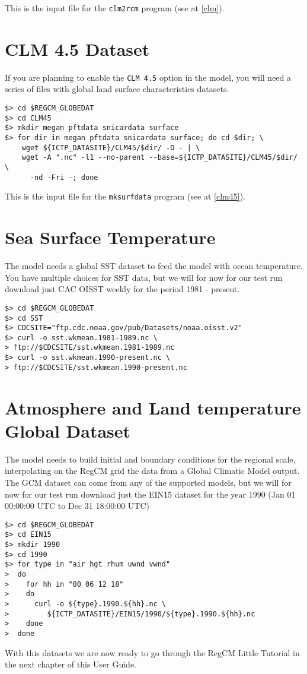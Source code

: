 This is the input file for the \verb=clm2rcm= program (see at \ref{clm}).

\section{CLM 4.5 Dataset}
\label{clm45data}

If you are planning to enable the \verb=CLM 4.5= option in the model, you will
need a series of files with global land surface characteristics datasets.

\begin{Verbatim}
$> cd $REGCM_GLOBEDAT
$> cd CLM45
$> mkdir megan pftdata snicardata surface
$> for dir in megan pftdata snicardata surface; do cd $dir; \
    wget ${ICTP_DATASITE}/CLM45/$dir/ -O - | \
    wget -A ".nc" -l1 --no-parent --base=${ICTP_DATASITE}/CLM45/$dir/ \
      -nd -Fri -; done
\end{Verbatim}

This is the input file for the \verb=mksurfdata= program (see at \ref{clm45}).

\section{Sea Surface Temperature}

The model needs a global SST dataset to feed the model with ocean temperature.
You have multiple choices for SST data, but we will for now for our test run
download just CAC OISST weekly for the period 1981 - present.

\begin{Verbatim}
$> cd $REGCM_GLOBEDAT
$> cd SST
$> CDCSITE="ftp.cdc.noaa.gov/pub/Datasets/noaa.oisst.v2"
$> curl -o sst.wkmean.1981-1989.nc \
> ftp://$CDCSITE/sst.wkmean.1981-1989.nc
$> curl -o sst.wkmean.1990-present.nc \
> ftp://$CDCSITE/sst.wkmean.1990-present.nc
\end{Verbatim}

\section{Atmosphere and Land temperature Global Dataset}

The model needs to build initial and boundary conditions for the regional scale,
interpolating on the RegCM grid the data from a Global Climatic Model output.
The GCM dataset can come from any of the supported models, but we will for now
for our test run download just the EIN15 dataset for the year 1990
(Jan 01 00:00:00 UTC to Dec 31 18:00:00 UTC)

\begin{Verbatim}
$> cd $REGCM_GLOBEDAT
$> cd EIN15
$> mkdir 1990
$> cd 1990
$> for type in "air hgt rhum uwnd vwnd"
>  do
>    for hh in "00 06 12 18"
>    do
>      curl -o ${type}.1990.${hh}.nc \
>         ${ICTP_DATASITE}/EIN15/1990/${type}.1990.${hh}.nc
>    done
>  done
\end{Verbatim}

With this datasets we are now ready to go through the RegCM Little Tutorial
in the next chapter of this User Guide.

